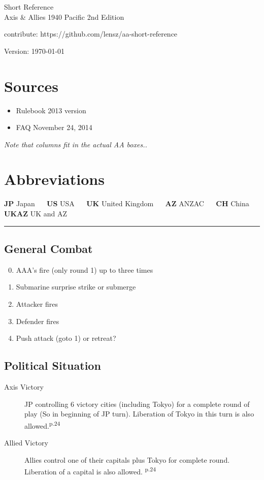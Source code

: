 \documentclass[10pt,twoside]{article}
\begin{document}
\begin{multicols*}{3}
\begin{center}
{\Large Short Reference}\\
\vspace{.2cm}
{\large Axis \& Allies 1940 Pacific 2nd Edition}

\vspace{.5cm}
contribute: https://github.com/lensz/aa-short-reference

\vspace{.5cm}
Version: \today
\end{center}

\section*{{\normalsize Sources}}
\begin{itemize}
\item Rulebook 2013 version
\item FAQ November 24, 2014
\end{itemize}

\noindent\textsl{Note that columns fit in the actual AA boxes..}

\section*{{\normalsize Abbreviations}}
\textbf{JP} Japan ~~ \textbf{US} USA ~~ \textbf{UK} United Kingdom ~~ \textbf{AZ} ANZAC ~~ \textbf{CH} China ~~ \textbf{UKAZ} UK and AZ



\noindent\rule{7.5cm}{0.4pt}

\subsection*{General Combat}
\begin{enumerate}
\setcounter{enumi}{-1}
\item AAA's fire (only round 1) up to three times
\item Submarine surprise strike or submerge
\item Attacker fires
\item Defender fires
\item Push attack (goto 1) or retreat?
\end{enumerate}

\subsection*{Political Situation}
\begin{description}
\item[Axis Victory] JP controlling 6 victory cities (including Tokyo) for a complete round of play (So in beginning of JP turn). Liberation of Tokyo in this turn is also allowed.\textsuperscript{p.24}
\item[Allied Victory] Allies control one of their capitals plus Tokyo for complete round. Liberation  of a capital is also allowed. \textsuperscript{p.24}
\end{description}


\end{multicols*}
\end{document}
